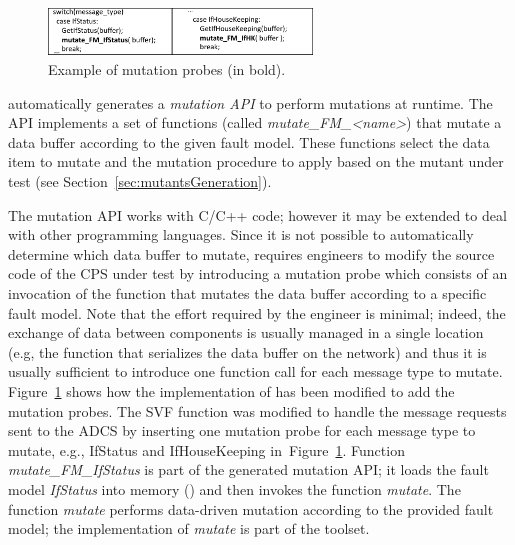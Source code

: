 \begin{figure}[tb]
\centering
\includegraphics[width=7cm]{damat/images/ProbesExample}
\caption{Example of \APPR mutation probes (in bold).}
\label{fig:appr:ProbesExample}
\end{figure}

\APPR automatically generates a \emph{mutation API} to perform mutations at runtime. The API implements a set of functions (called \emph{mutate\_FM\_<name>}) that mutate a data buffer according to the given fault model. 
These functions select the data item to mutate and the mutation procedure to apply based on the mutant under test (see Section~\ref{sec:mutantsGeneration}). 

The \APPR mutation API works with C/C++ code; however it may be extended to deal with other programming languages.
Since it is not possible to automatically determine which data buffer to mutate, \APPR requires engineers to modify the source code of the CPS under test by introducing a mutation probe which consists of an invocation of the \APPR function that mutates the data buffer according to a specific fault model.
Note that the effort required by the engineer is minimal; indeed, the exchange of data between components is usually managed in a single location (e.g, the function that serializes the data buffer on the network) and thus it is usually sufficient to introduce one function call for each message type to mutate.
Figure~\ref{fig:appr:ProbesExample} shows how the implementation of \ESAIL has been modified to add the mutation probes. 
The SVF function was modified to handle the message requests sent to the ADCS by inserting one mutation probe for each message type to mutate, e.g., IfStatus and IfHouseKeeping in~Figure~\ref{fig:appr:ProbesExample}. 
Function \emph{mutate\_FM\_IfStatus} is part of the generated mutation API; it loads the fault model \emph{IfStatus} into memory () and then invokes the function \emph{mutate}. The function \emph{mutate} performs data-driven mutation according to the provided fault model; the implementation of \emph{mutate} is part of the \APPR toolset.





